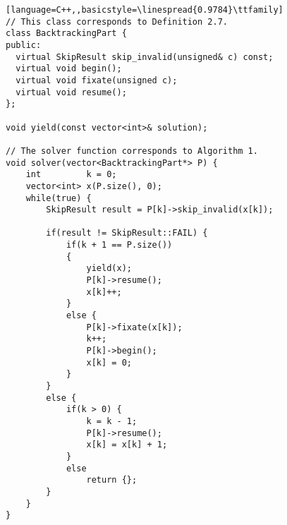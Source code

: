 \begin{lstlisting}[language=C++,,basicstyle=\linespread{0.9784}\ttfamily]
// This class corresponds to Definition 2.7.
class BacktrackingPart {
public:
  virtual SkipResult skip_invalid(unsigned& c) const;
  virtual void begin();
  virtual void fixate(unsigned c);
  virtual void resume();
};

void yield(const vector<int>& solution);

// The solver function corresponds to Algorithm 1.
void solver(vector<BacktrackingPart*> P) {
    int         k = 0;
    vector<int> x(P.size(), 0);
    while(true) {
        SkipResult result = P[k]->skip_invalid(x[k]);

        if(result != SkipResult::FAIL) {
            if(k + 1 == P.size())
            {
                yield(x);
                P[k]->resume();
                x[k]++;
            }
            else {
                P[k]->fixate(x[k]);
                k++;
                P[k]->begin();
                x[k] = 0;
            }
        }
        else {
            if(k > 0) {
                k = k - 1;
                P[k]->resume();
                x[k] = x[k] + 1;
            }
            else
                return {};
        }
    }
}
\end{lstlisting}
